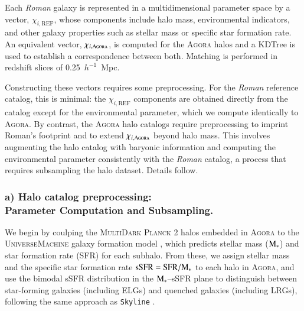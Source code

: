 \documentclass[]{aa} %
\begin{document}
Each \emph{Roman} galaxy is represented in a multidimensional parameter space by a vector, $\chi_{i,\text{REF}}$, whose components include halo mass, environmental indicators, and other galaxy properties such as stellar mass or specific star formation rate. An equivalent vector, $\chi_{i,\text{\textsc{Agora}}}$, is computed for the \textsc{Agora} halos and a KDTree is used to establish a correspondence between both. Matching is performed in redshift slices of 0.25~$h^{-1}$~Mpc.

Constructing these vectors requires some preprocessing. For the \emph{Roman} reference catalog, this is minimal: the $\chi_{i,\mathrm{REF}}$ components are obtained directly from the catalog except for the environmental parameter, which we compute identically to \textsc{Agora}. By contrast, the \textsc{Agora} halo catalogs require preprocessing to imprint Roman’s footprint and to extend $\chi_{i,\textsc{Agora}}$ beyond halo mass. This involves augmenting the halo catalog with baryonic information and computing the environmental parameter consistently with the \emph{Roman} catalog, a process that requires subsampling the halo dataset. Details follow.


\subsubsection*{{a) Halo catalog preprocessing: \\Parameter Computation and Subsampling.}}

We begin by coulping the \textsc{MultiDark Planck 2} halos embedded in \textsc{Agora} to the \textsc{UniverseMachine} galaxy formation model \citep{behroozi2019universemachine}, which predicts stellar mass ($\rm M_*$) and star formation rate (SFR) for each subhalo. From these, we assign stellar mass and the specific star formation rate ${\rm sSFR= SFR}/\rm{M}_*$ to each halo in \textsc{Agora}, and use the bimodal sSFR distribution in the $\rm{M}_*$–sSFR plane \citep{blanton2009physical} to distinguish between star-forming galaxies (including ELGs) and quenched galaxies (including LRGs), following the same approach as \texttt{Skyline} \citep{JB2023}. 
\end{document}

